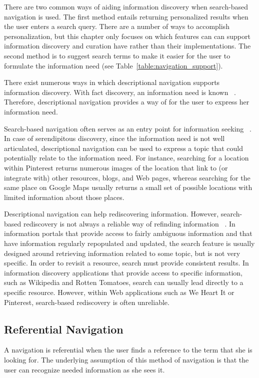 {{There are two common ways of aiding information discovery when search-based navigation is used. The first method entails returning personalized results when the user enters a search query. There are a number of ways to accomplish personalization, but this chapter only focuses on which features can can support information discovery and curation have rather than their implementations. The second method is to suggest search terms to make it easier for the user to formulate the information need (see Table~\ref{table:navigation_support}). 

There exist numerous ways in which descriptional navigation supports information discovery. With fact discovery, an information need is known ~\cite{kellar2006, kellar2007}. Therefore, descriptional navigation provides a way of for the user to express her information need. 

Search-based navigation often serves as an entry point for information seeking ~\cite{levene}. In case of serendipitous discovery, since the information need is not well articulated, descriptional navigation can be used to express a topic that could potentially relate to the information need. For instance, searching for a location within Pinterest returns numerous images of the location that link to (or integrate with) other resources, blogs, and Web pages, whereas searching for the same place on Google Maps usually returns a small set of possible locations with limited information about those places.

Descriptional navigation can help rediscovering information. However, search-based rediscovery is not always a reliable way of refinding information ~\cite{cockburn}. In information portals that provide access to fairly ambiguous information and that have information regularly repopulated and updated, the search feature is usually designed around retrieving information related to some topic, but is not very specific. In order to revisit a resource, search must provide consistent results. In information discovery applications that provide access to specific information, such as Wikipedia and Rotten Tomatoes, search can usually lead directly to a specific resource. However, within Web applications such as We Heart It or Pinterest, search-based rediscovery is often unreliable.
} %

{\subsection{Referential Navigation}
A navigation is referential when the user finds a reference to the term that she is looking for.  The underlying assumption of this method of navigation is that the user can recognize needed information as she sees it.

}}
